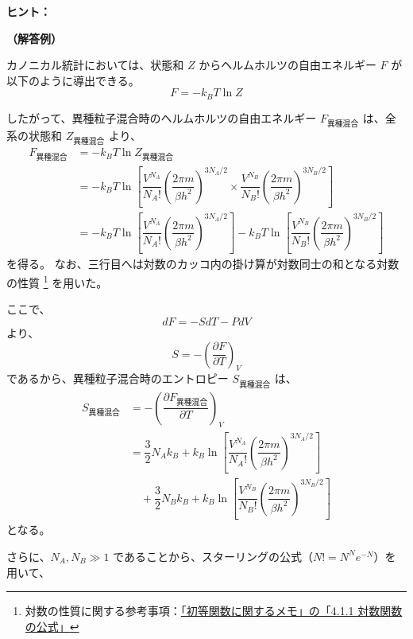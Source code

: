 \documentclass[uplatex,dvipdfmx,a4paper,11pt]{jsarticle}
\begin{document}
\begin{enumerate}
\begin{itembox}[l]{{\bf ヒント：}}
\end{itembox}

{\bf （解答例）}

カノニカル統計においては、状態和 $Z$ からヘルムホルツの自由エネルギー $F$ が以下のように導出できる。
\begin{equation*}
F = -k_BT \ln Z
\end{equation*}  

したがって、異種粒子混合時のヘルムホルツの自由エネルギー $F_{\text{異種混合}}$ は、全系の状態和 $Z_{\text{異種混合}}$ より、
\begin{align*}
F_{\text{異種混合}}
	&= -k_BT \ln Z_{\text{異種混合}} \\
	&= -k_BT \ln \left[ \dfrac{V^{N_A}}{N_A !}\left(\dfrac{2 \pi m}{\beta h^2} \right)^{3 N_A /2} \times \dfrac{V^{N_B}}{N_B !}\left(\dfrac{2 \pi m}{\beta h^2} \right)^{3 N_B /2} \right] \\
	&= -k_BT \ln \left[ \dfrac{V^{N_A}}{N_A !}\left(\dfrac{2 \pi m}{\beta h^2} \right)^{3 N_A /2} \right] 
	-k_BT \ln \left[ \dfrac{V^{N_B}}{N_B !}\left(\dfrac{2 \pi m}{\beta h^2} \right)^{3 N_B /2} \right]
\end{align*}
を得る。
なお、三行目へは対数のカッコ内の掛け算が対数同士の和となる対数の性質
\footnote{
対数の性質に関する参考事項：\href{http://kisokouza.island.ac/documents/Math_Basic.pdf}{「初等関数に関するメモ」の「4.1.1 対数関数の公式」}
}
を用いた。

ここで、
\begin{equation*}
d F = -S dT - P dV
\end{equation*}
より、
\begin{equation*}
S = -\left(\dfrac{\partial F}{\partial T} \right)_V
\end{equation*}
であるから、異種粒子混合時のエントロピー $S_{\text{異種混合}}$ は、
\begin{align*}
S_{\text{異種混合}}
	&= -\left(\dfrac{\partial F_{\text{異種混合}}}{\partial T} \right)_V \\
	&= \dfrac{3}{2} N_A k_B + k_B \ln \left[ \dfrac{V^{N_A}}{N_A !}\left(\dfrac{2 \pi m}{\beta h^2} \right)^{3 N_A /2} \right] \\
	&\quad + \dfrac{3}{2} N_B k_B + k_B \ln \left[ \dfrac{V^{N_B}}{N_B !}\left(\dfrac{2 \pi m}{\beta h^2} \right)^{3 N_B /2} \right]
\end{align*}
となる。

さらに、$N_A, N_B \gg 1$ であることから、スターリングの公式（$N! = N^N e^{-N}$）を用いて、


\end{enumerate}
\end{document}
